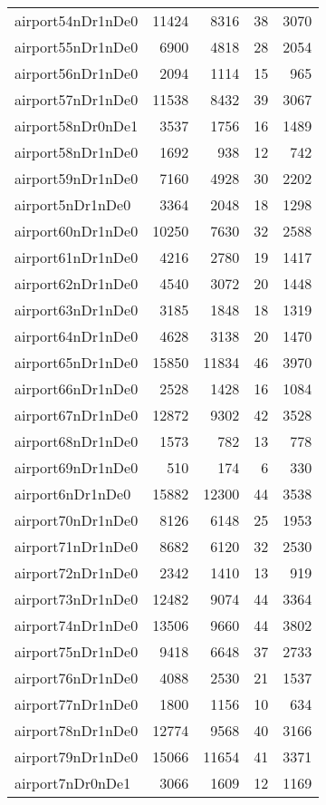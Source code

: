\begin{longtable}{lrrrr}
airport54nDr1nDe0 & 11424 & 8316 & 38 & 3070 \\
airport55nDr1nDe0 & 6900 & 4818 & 28 & 2054 \\
airport56nDr1nDe0 & 2094 & 1114 & 15 & 965 \\
airport57nDr1nDe0 & 11538 & 8432 & 39 & 3067 \\
airport58nDr0nDe1 & 3537 & 1756 & 16 & 1489 \\
airport58nDr1nDe0 & 1692 & 938 & 12 & 742 \\
airport59nDr1nDe0 & 7160 & 4928 & 30 & 2202 \\
airport5nDr1nDe0 & 3364 & 2048 & 18 & 1298 \\
airport60nDr1nDe0 & 10250 & 7630 & 32 & 2588 \\
airport61nDr1nDe0 & 4216 & 2780 & 19 & 1417 \\
airport62nDr1nDe0 & 4540 & 3072 & 20 & 1448 \\
airport63nDr1nDe0 & 3185 & 1848 & 18 & 1319 \\
airport64nDr1nDe0 & 4628 & 3138 & 20 & 1470 \\
airport65nDr1nDe0 & 15850 & 11834 & 46 & 3970 \\
airport66nDr1nDe0 & 2528 & 1428 & 16 & 1084 \\
airport67nDr1nDe0 & 12872 & 9302 & 42 & 3528 \\
airport68nDr1nDe0 & 1573 & 782 & 13 & 778 \\
airport69nDr1nDe0 & 510 & 174 & 6 & 330 \\
airport6nDr1nDe0 & 15882 & 12300 & 44 & 3538 \\
airport70nDr1nDe0 & 8126 & 6148 & 25 & 1953 \\
airport71nDr1nDe0 & 8682 & 6120 & 32 & 2530 \\
airport72nDr1nDe0 & 2342 & 1410 & 13 & 919 \\
airport73nDr1nDe0 & 12482 & 9074 & 44 & 3364 \\
airport74nDr1nDe0 & 13506 & 9660 & 44 & 3802 \\
airport75nDr1nDe0 & 9418 & 6648 & 37 & 2733 \\
airport76nDr1nDe0 & 4088 & 2530 & 21 & 1537 \\
airport77nDr1nDe0 & 1800 & 1156 & 10 & 634 \\
airport78nDr1nDe0 & 12774 & 9568 & 40 & 3166 \\
airport79nDr1nDe0 & 15066 & 11654 & 41 & 3371 \\
airport7nDr0nDe1 & 3066 & 1609 & 12 & 1169 \\

\end{longtable}
